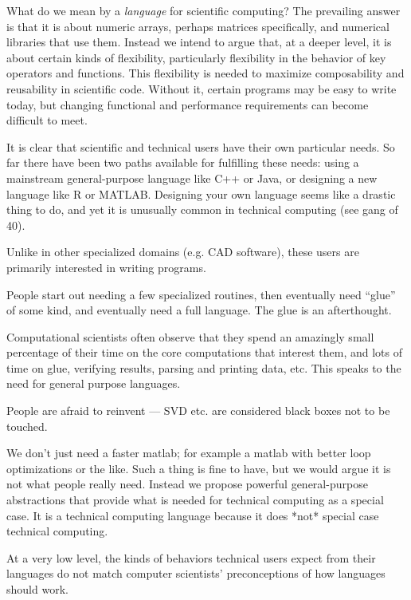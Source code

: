 What do we mean by a \emph{language} for scientific computing?
The prevailing
answer is that it is about numeric arrays, perhaps matrices specifically,
and numerical libraries that use them.
Instead we intend to argue that, at a
deeper level, it is about certain kinds of flexibility, particularly
flexibility in the behavior of key operators and functions. This flexibility
is needed to maximize composability and reusability in scientific code.
Without it, certain programs may be easy to write today, but changing
functional and performance requirements can become difficult to meet.





It is clear that scientific and technical users have their own particular
needs. So far there have been two paths available for fulfilling these
needs: using a mainstream general-purpose language like C++ or Java, or
designing a new language like R or MATLAB. Designing your own language
seems like a drastic thing to do, and yet it is unusually common in
technical computing (see gang of 40).

Unlike in other specialized domains (e.g. CAD software), these users
are primarily interested in writing programs.

People start out needing a few specialized routines, then eventually
need ``glue'' of some kind, and eventually need a full language.
The glue is an afterthought.

Computational scientists often observe that they spend an amazingly
small percentage of their time on the core computations that
interest them, and lots of time on glue, verifying results,
parsing and printing data, etc. This speaks to the need for
general purpose languages.

People are afraid to reinvent --- SVD etc. are considered black
boxes not to be touched.

We don't just need a faster matlab; for example a matlab with better
loop optimizations or the like. Such a thing is fine to have,
but we would argue it is not what people really need.
Instead we propose powerful general-purpose abstractions that
provide what is needed for technical computing as a special case.
It is a technical computing language because it does *not*
special case technical computing.


At a very low level, the kinds of behaviors technical users expect
from their languages do not match computer scientists' preconceptions
of how languages should work.

